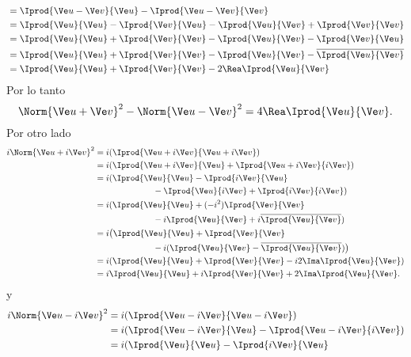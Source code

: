 \begin{sol}
\begin{enumerate}
\begin{align*}
							 &= \Iprod{\Ve u-\Ve v}{\Ve u}-\Iprod{\Ve u-\Ve v}{\Ve v} \\
							 &= \Iprod{\Ve u}{\Ve u} - \Iprod{\Ve v}{\Ve u} - \Iprod{\Ve u}{\Ve v} + \Iprod{\Ve v}{\Ve v} \\
							 &=  \Iprod{\Ve u}{\Ve u} + \Iprod{\Ve v}{\Ve v} - \Iprod{\Ve u}{\Ve v} - \Iprod{\Ve v}{\Ve u} \\
							 &= \Iprod{\Ve u}{\Ve u} + \Iprod{\Ve v}{\Ve v} - \Iprod{\Ve u}{\Ve v} - \overline{\Iprod{\Ve u}{\Ve v}} \\
							 &= \Iprod{\Ve u}{\Ve u} + \Iprod{\Ve v}{\Ve v} - 2\Rea\Iprod{\Ve u}{\Ve v}
		\end{align*}
		Por lo tanto
		\begin{equation}
		\Norm{\Ve u+\Ve v}^2-\Norm{\Ve u-\Ve v}^2 = 4\Rea\Iprod{\Ve u}{\Ve v}.
		\end{equation}
		Por otro lado
		\begin{align*}
		i\Norm{\Ve u+i\Ve v}^2 &= i(\Iprod{\Ve u+i\Ve v}{\Ve u+i\Ve v}) \\
							 &= i(\Iprod{\Ve u+i\Ve v}{\Ve u}+\Iprod{\Ve u+i\Ve v}{i\Ve v}) \\
							 &= i(\Iprod{\Ve u}{\Ve u} - \Iprod{i\Ve v}{\Ve u} \\
							 &\phantom{=}\hspace{6em}- \Iprod{\Ve u}{i\Ve v} + \Iprod{i\Ve v}{i\Ve v}) \\
							 &= i(\Iprod{\Ve u}{\Ve u} + (-i^2)\Iprod{\Ve v}{\Ve v}  \\
							 &\phantom{=}\hspace{6em}-i\Iprod{\Ve u}{\Ve v}  +i\overline{\Iprod{\Ve u}{\Ve v}}) \\
							 &= i\big(\Iprod{\Ve u}{\Ve u} + \Iprod{\Ve v}{\Ve v} \\
							 &\phantom{=}\hspace{6em}-i (\Iprod{\Ve u}{\Ve v} - \overline{\Iprod{\Ve u}{\Ve v}})\big) \\
							 &= i(\Iprod{\Ve u}{\Ve u} + \Iprod{\Ve v}{\Ve v} -i2\Ima\Iprod{\Ve u}{\Ve v}) \\
							 &= i\Iprod{\Ve u}{\Ve u} + i\Iprod{\Ve v}{\Ve v} + 2\Ima\Iprod{\Ve u}{\Ve v}.
		\end{align*}
		y
		\begin{align*}
		i\Norm{\Ve u-i\Ve v}^2 &= i(\Iprod{\Ve u-i\Ve v}{\Ve u-i\Ve v}) \\
		&= i(\Iprod{\Ve u-i\Ve v}{\Ve u}-\Iprod{\Ve u-i\Ve v}{i\Ve v}) \\
		&= i(\Iprod{\Ve u}{\Ve u} - \Iprod{i\Ve v}{\Ve u} \\

\end{align*}
\end{enumerate}
\end{sol}
